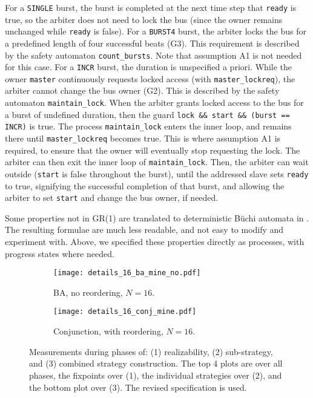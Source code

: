 \documentclass[copyright]{eptcs}
\begin{document}
For a \texttt{SINGLE} burst, the burst is completed at the next time step that \texttt{ready} is true, so the arbiter does not need to lock the bus (since the owner remains unchanged while \texttt{ready} is false).
For a \texttt{BURST4} burst, the arbiter locks the bus for a predefined length of four successful beats (G3).
This requirement is described by the safety automaton \texttt{count\_bursts}.
Note that assumption A1 is not needed for this case.
For a \texttt{INCR} burst, the duration is unspecified a priori.
While the owner \texttt{master} continuously requests locked access (with \texttt{master\_lockreq}), the arbiter cannot change the bus owner (G2).
This is described by the safety automaton \texttt{maintain\_lock}.
When the arbiter grants locked access to the bus for a burst of undefined duration, then the guard \texttt{lock \&\& start \&\& (burst == INCR)} is true.
The process \texttt{maintain\_lock} enters the inner loop, and remains there until \texttt{master\_lockreq} becomes true.
This is where assumption A1 is required, to ensure that the owner will eventually stop requesting the lock.
The arbiter can then exit the inner loop of \texttt{maintain\_lock}.
Then, the arbiter can wait outside (\texttt{start} is false throughout the burst), until the addressed slave sets \texttt{ready} to true, signifying the successful completion of that burst, and allowing the arbiter to set \texttt{start} and change the bus owner, if needed.

Some properties not in GR(1) are translated to deterministic B\"{u}chi automata in \cite{Bloem12jcss}.
The resulting formulae are much less readable, and not easy to modify and experiment with.
Above, we specified these properties directly as processes, with progress states where needed.


\begin{figure}[t]
\centering
\begin{subfigure}{0.49\textwidth}
\texttt{[image: details\_16\_ba\_mine\_no.pdf]}
\caption{BA, no reordering, $N = 16$.}
\label{subfig:details_16_ba_mine_no}
\end{subfigure}
\begin{subfigure}{0.49\textwidth}
\texttt{[image: details\_16\_conj\_mine.pdf]}
\caption{Conjunction, with reordering, $N = 16$.}
\end{subfigure}
\caption{
	Measurements during phases of: (1) realizability, (2) sub-strategy, and (3) combined strategy construction.
	The top 4 plots are over all phases, the fixpoints over (1), the individual strategies over (2), and the bottom plot over (3).
	The revised specification is used.}
\label{fig:amba-details}
\end{figure}
\end{document}
